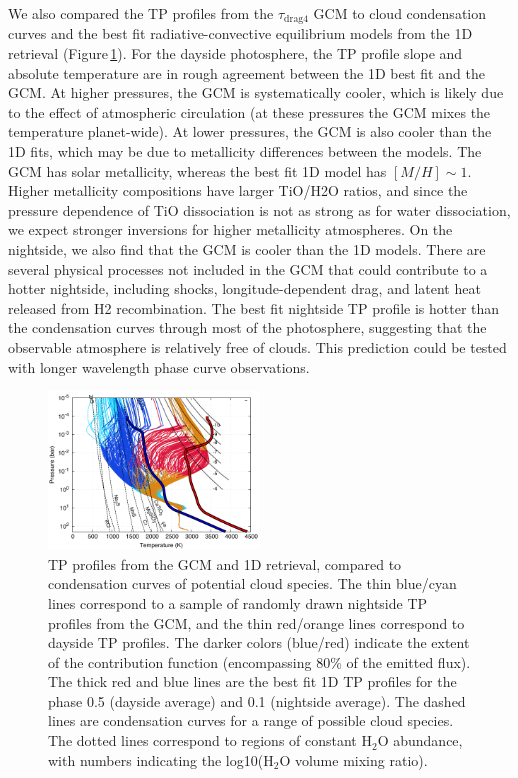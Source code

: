 \documentclass[twocolumn]{aastex61}
\begin{document}
We also compared the TP profiles from the $\tau_\mathrm{drag4}$ GCM to cloud condensation curves and the best fit radiative-convective equilibrium models from the 1D retrieval (Figure\,\ref{fig:TP}).  For the dayside photosphere, the TP profile slope and absolute temperature are in rough agreement between the 1D best fit and the GCM. At higher pressures, the GCM is systematically cooler, which is likely due to the effect of atmospheric circulation (at these pressures the GCM mixes the temperature planet-wide). At lower pressures, the GCM is also cooler than the 1D fits, which may be due to metallicity differences between the models. The GCM has solar metallicity, whereas the best fit 1D model has $[M/H] \sim 1$. Higher metallicity compositions have larger TiO/H2O ratios, and since the pressure dependence of TiO dissociation is not as strong as for water dissociation, we expect stronger inversions for higher metallicity atmospheres.  On the nightside, we also find that the GCM is cooler than the 1D models.  There are several physical processes not included in the GCM that could contribute to a hotter nightside, including shocks, longitude-dependent drag, and latent heat released from H2 recombination.  The best fit nightside TP profile is hotter than the condensation curves through most of the photosphere, suggesting that the observable atmosphere is relatively free of clouds. This prediction could be tested with longer wavelength phase curve observations.


\begin{figure}
\includegraphics[width = 0.5\textwidth]{fig13.pdf}
\caption{TP profiles from the GCM and 1D retrieval, compared to condensation curves of potential cloud species. The thin blue/cyan lines correspond to a sample of randomly drawn nightside TP profiles from the GCM, and the thin red/orange lines correspond to dayside TP profiles. The darker colors (blue/red) indicate the extent of the contribution function (encompassing 80\% of the emitted flux). The thick red and blue lines are the best fit 1D TP profiles for the phase 0.5 (dayside average) and 0.1 (nightside average). The dashed lines are condensation curves for a range of possible cloud species.  The dotted lines correspond to regions of constant H$_2$O abundance, with numbers indicating the log10(H$_2$O volume mixing ratio).}
\label{fig:TP}
\end{figure}
\end{document}
